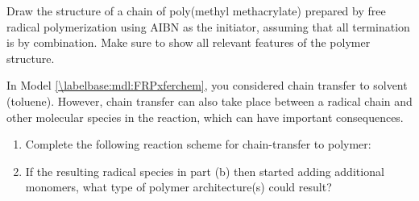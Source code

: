 \begin{activity}
\begin{exercises}
	\exercise Draw the structure of a chain of poly(methyl methacrylate) prepared by free radical polymerization using AIBN as the initiator, assuming that all termination is by combination.  Make sure to show all relevant features of the polymer structure.
	
		\begin{solution}\end{solution}
	
	\exercise In Model \ref{\labelbase:mdl:FRPxferchem}, you considered chain transfer to solvent (toluene).  However, chain transfer can also take place between a radical chain and other molecular species in the reaction, which can have important consequences.
	
		\begin{enumerate}
			
			\item Complete the following reaction scheme for chain-transfer to polymer:
	
			\begin{solution}\end{solution}
			
			\item If the resulting radical species in part (b) then started adding additional monomers, what type of polymer architecture(s) could result?
			
				\begin{solution}\end{solution}
		\end{enumerate}
		
	
\end{exercises}


%
%	


	
\end{activity}